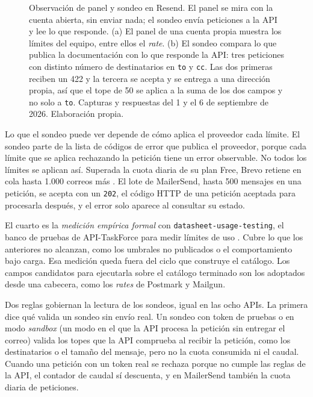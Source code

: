 \begin{figure}[tbp]
\centering

\caption[Observación de panel y sondeo en Resend]{Observación de panel y sondeo en Resend. El panel se mira con la cuenta abierta, sin enviar nada; el sondeo envía peticiones a la API y lee lo que responde. (a) El panel de una cuenta propia muestra los límites del equipo, entre ellos el \textit{rate}. (b) El sondeo compara lo que publica la documentación con lo que responde la API: tres peticiones con distinto número de destinatarios en \texttt{to} y \texttt{cc}. Las dos primeras reciben un 422 y la tercera se acepta y se entrega a una dirección propia, así que el tope de 50 se aplica a la suma de los dos campos y no solo a \texttt{to}. Capturas y respuestas del 1 y el 6 de septiembre de 2026. Elaboración propia.}
\label{fig:propuesta:panel-sondeo}
\end{figure}

Lo que el sondeo puede ver depende de cómo aplica el proveedor cada límite.
El sondeo parte de la lista de códigos de error que publica el proveedor, porque cada límite que se aplica rechazando la petición tiene un error observable.
No todos los límites se aplican así.
Superada la cuota diaria de su plan Free, Brevo retiene en cola hasta 1.000 correos más \citep{brevohelpfree}.
El lote de MailerSend, hasta 500 mensajes en una petición, se acepta con un \texttt{202}, el código HTTP de una petición aceptada para procesarla después, y el error solo aparece al consultar su estado.

El cuarto es la \textit{medición empírica formal} con \texttt{datasheet-usage-testing}, el banco de pruebas de API-TaskForce para medir límites de uso \citep{datasheetusagetesting}.
Cubre lo que los anteriores no alcanzan, como los umbrales no publicados o el comportamiento bajo carga.
Esa medición queda fuera del ciclo que construye el catálogo.
Los campos candidatos para ejecutarla sobre el catálogo terminado son los adoptados desde una cabecera, como los \textit{rates} de Postmark y Mailgun.

Dos reglas gobiernan la lectura de los sondeos, igual en las ocho APIs.
La primera dice qué valida un sondeo sin envío real.
Un sondeo con token de pruebas o en modo \textit{sandbox} (un modo en el que la API procesa la petición sin entregar el correo) valida los topes que la API comprueba al recibir la petición, como los destinatarios o el tamaño del mensaje, pero no la cuota consumida ni el caudal.
Cuando una petición con un token real se rechaza porque no cumple las reglas de la API, el contador de caudal sí descuenta, y en MailerSend también la cuota diaria de peticiones.

